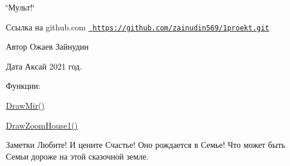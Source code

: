 \char`\"{}Мульт!\char`\"{}

\begin{DoxyParagraph}{Ссылка на github.com}
\href{https://github.com/zainudin569/1proekt.git}{\texttt{ https\+://github.\+com/zainudin569/1proekt.\+git}}
\end{DoxyParagraph}
\begin{DoxyAuthor}{Автор}
Ожаев Зайнудин 
\end{DoxyAuthor}
\begin{DoxyDate}{Дата}
Аксай 2021 год.
\end{DoxyDate}
\begin{DoxyParagraph}{Функции\+:}

\begin{DoxyItemize}
\item \mbox{\hyperlink{_ozhaev_01_zaynudin_01cartoon_8cpp_a6484c6b48dd41123c803b7825f72c4c4}{Draw\+Mir()}}  
\item \mbox{\hyperlink{_ozhaev_01_zaynudin_01cartoon_8cpp_a14dbbb9029429641d219e57cf2edd5c7}{Draw\+Zoom\+House1()}}  
\end{DoxyItemize}
\end{DoxyParagraph}
\begin{DoxyNote}{Заметки}
Любите! И цените Счастье! Оно рождается в Семье! Что может быть Семьи дороже на этой сказочной земле. 
\end{DoxyNote}
